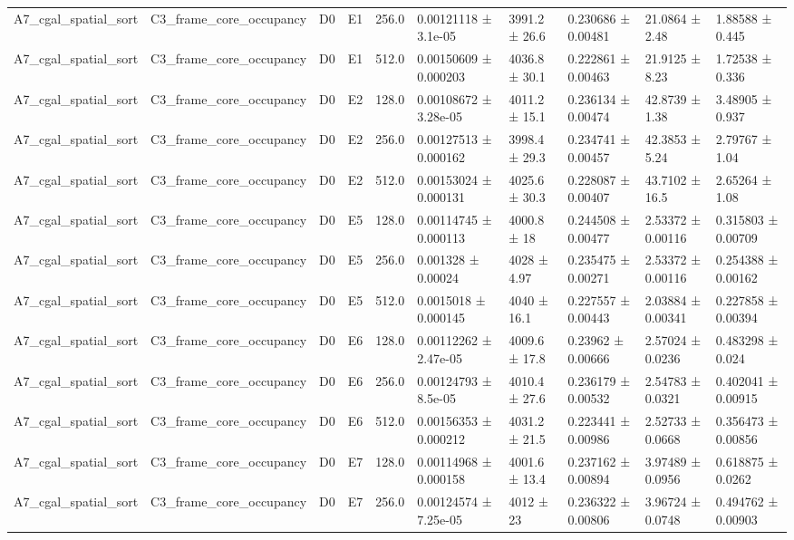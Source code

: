 \begin{table}
\begin{tabular}{llllllllll}
A7\_cgal\_spatial\_sort & C3\_frame\_core\_occupancy & D0 & E1 & 256.0 & 0.00121118 ± 3.1e-05 & 3991.2 ± 26.6 & 0.230686 ± 0.00481 & 21.0864 ± 2.48 & 1.88588 ± 0.445 \\
A7\_cgal\_spatial\_sort & C3\_frame\_core\_occupancy & D0 & E1 & 512.0 & 0.00150609 ± 0.000203 & 4036.8 ± 30.1 & 0.222861 ± 0.00463 & 21.9125 ± 8.23 & 1.72538 ± 0.336 \\
A7\_cgal\_spatial\_sort & C3\_frame\_core\_occupancy & D0 & E2 & 128.0 & 0.00108672 ± 3.28e-05 & 4011.2 ± 15.1 & 0.236134 ± 0.00474 & 42.8739 ± 1.38 & 3.48905 ± 0.937 \\
A7\_cgal\_spatial\_sort & C3\_frame\_core\_occupancy & D0 & E2 & 256.0 & 0.00127513 ± 0.000162 & 3998.4 ± 29.3 & 0.234741 ± 0.00457 & 42.3853 ± 5.24 & 2.79767 ± 1.04 \\
A7\_cgal\_spatial\_sort & C3\_frame\_core\_occupancy & D0 & E2 & 512.0 & 0.00153024 ± 0.000131 & 4025.6 ± 30.3 & 0.228087 ± 0.00407 & 43.7102 ± 16.5 & 2.65264 ± 1.08 \\
A7\_cgal\_spatial\_sort & C3\_frame\_core\_occupancy & D0 & E5 & 128.0 & 0.00114745 ± 0.000113 & 4000.8 ± 18 & 0.244508 ± 0.00477 & 2.53372 ± 0.00116 & 0.315803 ± 0.00709 \\
A7\_cgal\_spatial\_sort & C3\_frame\_core\_occupancy & D0 & E5 & 256.0 & 0.001328 ± 0.00024 & 4028 ± 4.97 & 0.235475 ± 0.00271 & 2.53372 ± 0.00116 & 0.254388 ± 0.00162 \\
A7\_cgal\_spatial\_sort & C3\_frame\_core\_occupancy & D0 & E5 & 512.0 & 0.0015018 ± 0.000145 & 4040 ± 16.1 & 0.227557 ± 0.00443 & 2.03884 ± 0.00341 & 0.227858 ± 0.00394 \\
A7\_cgal\_spatial\_sort & C3\_frame\_core\_occupancy & D0 & E6 & 128.0 & 0.00112262 ± 2.47e-05 & 4009.6 ± 17.8 & 0.23962 ± 0.00666 & 2.57024 ± 0.0236 & 0.483298 ± 0.024 \\
A7\_cgal\_spatial\_sort & C3\_frame\_core\_occupancy & D0 & E6 & 256.0 & 0.00124793 ± 8.5e-05 & 4010.4 ± 27.6 & 0.236179 ± 0.00532 & 2.54783 ± 0.0321 & 0.402041 ± 0.00915 \\
A7\_cgal\_spatial\_sort & C3\_frame\_core\_occupancy & D0 & E6 & 512.0 & 0.00156353 ± 0.000212 & 4031.2 ± 21.5 & 0.223441 ± 0.00986 & 2.52733 ± 0.0668 & 0.356473 ± 0.00856 \\
A7\_cgal\_spatial\_sort & C3\_frame\_core\_occupancy & D0 & E7 & 128.0 & 0.00114968 ± 0.000158 & 4001.6 ± 13.4 & 0.237162 ± 0.00894 & 3.97489 ± 0.0956 & 0.618875 ± 0.0262 \\
A7\_cgal\_spatial\_sort & C3\_frame\_core\_occupancy & D0 & E7 & 256.0 & 0.00124574 ± 7.25e-05 & 4012 ± 23 & 0.236322 ± 0.00806 & 3.96724 ± 0.0748 & 0.494762 ± 0.00903 \\

\end{tabular}
\end{table}
